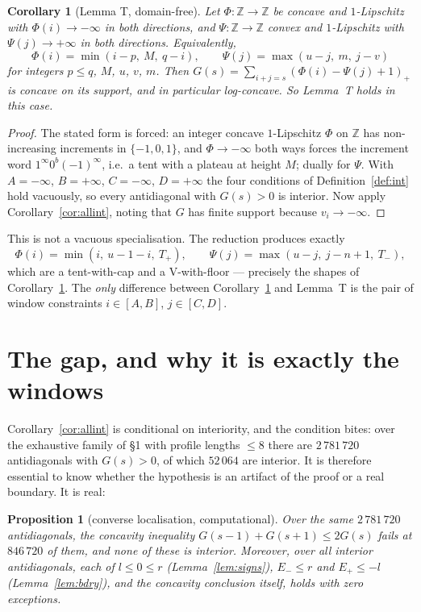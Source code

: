 \documentclass[11pt]{article}
\newtheorem{proposition}[theorem]{Proposition}
\newtheorem{corollary}[theorem]{Corollary}
\theoremstyle{definition}
\newcommand{\Z}{\mathbb{Z}}
\begin{document}
\begin{corollary}[Lemma T, domain-free]\label{cor:domfree}
Let $\Phi:\Z\to\Z$ be concave and $1$-Lipschitz with $\Phi(i)\to-\infty$ in both
directions, and $\Psi:\Z\to\Z$ convex and $1$-Lipschitz with $\Psi(j)\to+\infty$ in both
directions. Equivalently,
\[
  \Phi(i)=\min(i-p,\ M,\ q-i),\qquad \Psi(j)=\max(u-j,\ m,\ j-v)
\]
for integers $p\le q$, $M$, $u$, $v$, $m$. Then $G(s)=\sum_{i+j=s}(\Phi(i)-\Psi(j)+1)_+$
is \emph{concave on its support}, and in particular log-concave. So Lemma~T holds in
this case.
\end{corollary}
\begin{proof}
The stated form is forced: an integer concave $1$-Lipschitz $\Phi$ on $\Z$ has
non-increasing increments in $\{-1,0,1\}$, and $\Phi\to-\infty$ both ways forces the
increment word $1^\infty0^b(-1)^\infty$, i.e.\ a tent with a plateau at height $M$;
dually for $\Psi$. With $A=-\infty$, $B=+\infty$, $C=-\infty$, $D=+\infty$ the four
conditions of Definition~\ref{def:int} hold vacuously, so every antidiagonal with
$G(s)>0$ is interior. Now apply Corollary~\ref{cor:allint}, noting that $G$ has finite
support because $v_i\to-\infty$.
\end{proof}

This is not a vacuous specialisation. The reduction \cite[Prop.~4.3]{c1} produces exactly
\[
 \Phi(i)=\min(i,\ u-1-i,\ T_+),\qquad \Psi(j)=\max(u-j,\ j-n+1,\ T_-),
\]
which are a tent-with-cap and a V-with-floor --- precisely the shapes of
Corollary~\ref{cor:domfree}. The \emph{only} difference between
Corollary~\ref{cor:domfree} and Lemma~T is the pair of window constraints
$i\in[A,B]$, $j\in[C,D]$.

\section{The gap, and why it is exactly the windows}

Corollary~\ref{cor:allint} is conditional on interiority, and the condition bites: over
the exhaustive family of \S1 with profile lengths $\le8$ there are $2\,781\,720$
antidiagonals with $G(s)>0$, of which $52\,064$ are interior. It is therefore essential
to know whether the hypothesis is an artifact of the proof or a real boundary. It is
real:

\begin{proposition}[converse localisation, computational]\label{prop:converse}
Over the same $2\,781\,720$ antidiagonals, the concavity inequality
$G(s-1)+G(s+1)\le2G(s)$ fails at $846\,720$ of them, and \emph{none} of these is
interior. Moreover, over all interior antidiagonals, each of
$l\le0\le r$ (Lemma~\ref{lem:signs}), $E_-\le r$ and $E_+\le-l$
(Lemma~\ref{lem:bdry}), and the concavity conclusion itself, holds with zero exceptions.
\end{proposition}
\end{document}
